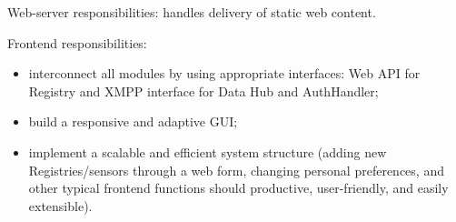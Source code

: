   Web-server responsibilities: handles delivery of static web content.

  Frontend responsibilities:
  \begin{itemize}
  \item interconnect all modules by using appropriate interfaces: Web API for Registry and XMPP interface for Data Hub and AuthHandler;
  \item build a responsive and adaptive GUI;
  \item implement a scalable and efficient system structure (adding new Registries/sensors through a web form, changing personal preferences, and other typical frontend functions should productive, user-friendly, and easily extensible).
  \end{itemize}